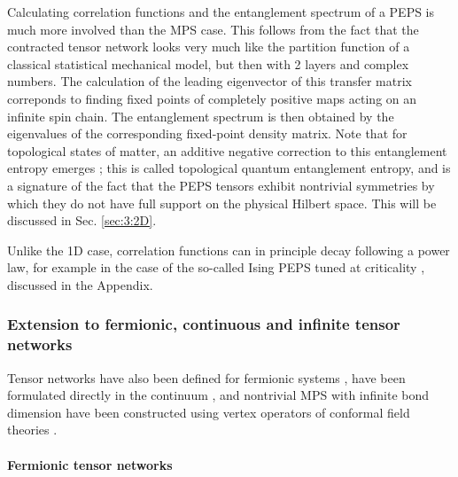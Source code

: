 \documentclass[rmp,aps,reprint,superscriptaddress,nobalancelastpage]{revtex4-1}
\begin{document}
Calculating correlation functions and the entanglement spectrum of a PEPS is much more involved than the MPS case. This follows from the fact that the contracted tensor network looks very much like the partition function of
a classical statistical mechanical model, but then with 2 layers and complex numbers. The calculation of the leading eigenvector of this transfer matrix correponds to finding fixed points of completely positive maps acting on an infinite spin chain.   The entanglement spectrum is then obtained by the eigenvalues of the corresponding fixed-point density matrix. Note that for topological states of matter, an additive negative correction to this entanglement entropy emerges \cite{kitaev:topological-entropy,levin:topological-entropy}; this is called  topological quantum entanglement entropy, and is a signature of the fact that the PEPS tensors exhibit nontrivial symmetries by which they do not have full support on the physical Hilbert space. This will be discussed in Sec. \ref{sec:3:2D}.


Unlike the 1D case, correlation functions can in principle decay following a power law, for example in the case of the so-called Ising PEPS tuned at criticality \cite{verstraete:comp-power-of-peps}, discussed in the Appendix.



\subsubsection{Extension to fermionic, continuous and infinite tensor networks \label{FandCTN}}

Tensor networks have also been defined for fermionic systems \cite{kraus:fPEPS,corboz:fMERA,barthel2009contraction,bultinck:fermionic-mps-phases}, have been formulated directly in the continuum \cite{verstraete2010continuous}, and nontrivial MPS with infinite bond dimension have been constructed using vertex operators of conformal field theories \cite{cirac2010infinite}.

\paragraph{Fermionic tensor networks}
\end{document}
